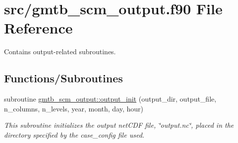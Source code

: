 \hypertarget{gmtb__scm__output_8f90}{}\section{src/gmtb\+\_\+scm\+\_\+output.f90 File Reference}
\label{gmtb__scm__output_8f90}


Contains output-\/related subroutines.  


\subsection*{Functions/\+Subroutines}
{\bf }\par
\begin{DoxyCompactItemize}
\item 
subroutine \hyperlink{group__output_gaa9451ee5665313bbfefdd24800338a95}{gmtb\+\_\+scm\+\_\+output\+::output\+\_\+init} (output\+\_\+dir, output\+\_\+file, n\+\_\+columns, n\+\_\+levels, year, month, day, hour)
\begin{DoxyCompactList}\small\item\em This subroutine initializes the output net\+C\+DF file, \char`\"{}output.\+nc\char`\"{}, placed in the directory specified by the case\+\_\+config file used. \end{DoxyCompactList}\end{DoxyCompactItemize}

